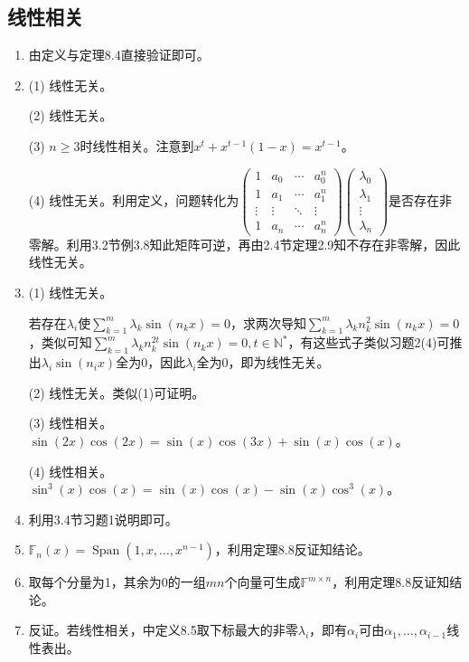 \documentclass[a4paper,UTF8,fontset=windows]{ctexart}
\DeclareMathOperator{\Span}{Span}
\begin{document}
\subsection{线性相关}
\begin{enumerate}
\item
由定义与定理8.4直接验证即可。

\item
(1) 线性无关。

(2) 线性无关。

(3) $n\ge3$时线性相关。注意到$x^t+x^{t-1}(1-x)=x^{t-1}$。

(4) 线性无关。利用定义，问题转化为$\begin{pmatrix}1&a_0&\cdots&a_0^n\\1&a_1&\cdots&a_1^n\\\vdots&\vdots&\ddots&\vdots\\1&a_n&\cdots&a_n^n\end{pmatrix}\begin{pmatrix}\lambda_0\\\lambda_1\\\vdots\\\lambda_n\end{pmatrix}$是否存在非零解。利用3.2节例3.8知此矩阵可逆，再由2.4节定理2.9知不存在非零解，因此线性无关。

\item
(1) 线性无关。

若存在$\lambda_i$使$\sum_{k=1}^m\lambda_k\sin(n_kx)=0$，求两次导知$\sum_{k=1}^m\lambda_kn_k^2\sin(n_kx)=0$，类似可知$\sum_{k=1}^m\lambda_kn_k^{2t}\sin(n_kx)=0,t\in\mathbb{N}^*$，有这些式子类似习题2(4)可推出$\lambda_i\sin(n_ix)$全为0，因此$\lambda_i$全为0，即为线性无关。

(2) 线性无关。类似(1)可证明。

(3) 线性相关。$\sin(2x)\cos(2x)=\sin(x)\cos(3x)+\sin(x)\cos(x)$。

(4) 线性相关。$\sin^3(x)\cos(x)=\sin(x)\cos(x)-\sin(x)\cos^3(x)$。

\item
利用3.4节习题1说明即可。

\item
$\mathbb{F}_n(x)=\Span(1,x,\dots,x^{n-1})$，利用定理8.8反证知结论。

\item
取每个分量为1，其余为0的一组$mn$个向量可生成$\mathbb{F}^{m\times n}$，利用定理8.8反证知结论。

\item
反证。若线性相关，中定义8.5取下标最大的非零$\lambda_i$，即有$\alpha_i$可由$\alpha_1,\dots,\alpha_{i-1}$线性表出。


\end{enumerate}
\end{document}
